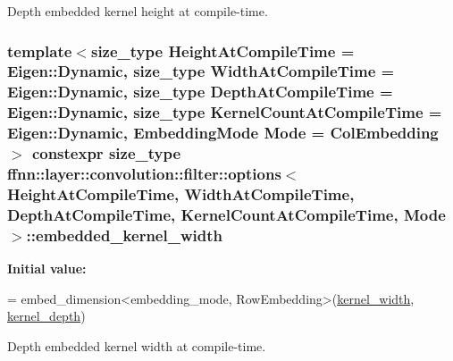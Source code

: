 Depth embedded kernel height at compile-\/time. 

\hypertarget{structffnn_1_1layer_1_1convolution_1_1filter_1_1options_a9cc6dff082340e5c7388f8878ea3a7f4}{
\subsubsection[{embedded\-\_\-kernel\-\_\-width}]{\setlength{\rightskip}{0pt plus 5cm}template$<$size\-\_\-type Height\-At\-Compile\-Time = Eigen\-::\-Dynamic, size\-\_\-type Width\-At\-Compile\-Time = Eigen\-::\-Dynamic, size\-\_\-type Depth\-At\-Compile\-Time = Eigen\-::\-Dynamic, size\-\_\-type Kernel\-Count\-At\-Compile\-Time = Eigen\-::\-Dynamic, Embedding\-Mode Mode = Col\-Embedding$>$ constexpr {\bf size\-\_\-type} {\bf ffnn\-::layer\-::convolution\-::filter\-::options}$<$ Height\-At\-Compile\-Time, Width\-At\-Compile\-Time, Depth\-At\-Compile\-Time, Kernel\-Count\-At\-Compile\-Time, Mode $>$\-::embedded\-\_\-kernel\-\_\-width\hspace{0.3cm}{\ttfamily [static]}}}\label{structffnn_1_1layer_1_1convolution_1_1filter_1_1options_a9cc6dff082340e5c7388f8878ea3a7f4}
{\bfseries Initial value\-:}
\begin{DoxyCode}
=
    embed\_dimension<embedding\_mode, RowEmbedding>(\hyperlink{structffnn_1_1layer_1_1convolution_1_1filter_1_1options_afd97cb92020381b3f2489b92946fdc11}{kernel\_width}, 
      \hyperlink{structffnn_1_1layer_1_1convolution_1_1filter_1_1options_a699036320138871693bcd0ecfb977d6b}{kernel\_depth})
\end{DoxyCode}


Depth embedded kernel width at compile-\/time. 


